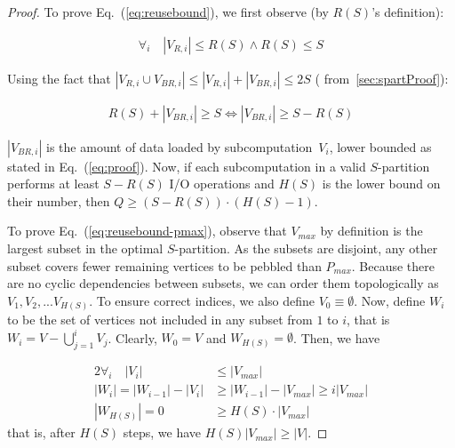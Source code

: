 \documentclass[sigplan,review,anonymous]{acmart}\settopmatter{printfolios=true,printccs=false,printacmref=false}
\begin{document}
\begin{proof}
	To prove Eq.~(\ref{eq:reusebound}), we first observe (by $R(S)$'s 
	definition):
	
	\vspace{-0.5em}
	\begin{gather}
	\nonumber
	\forall_{i}\quad |V_{R,i}| \le R(S) \land R(S) \le S 
	\end{gather}
	\vspace{-0.5em}
	
	Using the fact that $|V_{R,i} \cup V_{BR,i}| \le |V_{R,i}| + |V_{BR,i}| 
	\le 2S$ ( from~\cref{sec:spartProof}):
	
	\vspace{-0.5em}
	\begin{gather}
	\label{eq:proof}
	R(S) + |V_{BR,i}| \ge S \Leftrightarrow |V_{BR,i}| \ge S - R(S)
	\end{gather}
	\vspace{-0.5em}
	
	$|V_{BR,i}|$ is the amount of data loaded by subcomputation~$V_i$, lower 
	bounded as stated in Eq.~(\ref{eq:proof}). Now, if each
	subcomputation in a valid $S$-partition performs at least $S - R(S)$ I/O
	operations and $H(S)$ is the lower bound on their number, then $Q \ge (S -
	R(S)) \cdot (H(S) - 1)$.
	
	To prove Eq.~(\ref{eq:reusebound-pmax}), observe that $V_{max}$ by 
	definition
	is the largest subset in the optimal $S$-partition. As the subsets are
	disjoint, any other subset covers fewer remaining vertices to be pebbled 
	than
	$P_{max}$. Because there are no cyclic dependencies between subsets, we can
	order them topologically as $V_1, V_2, ...V_{H(S)}$. To ensure correct 
	indices,
	we also define $V_0 \equiv \emptyset$. Now, define $W_i$ to be the set
	of vertices not included in any subset from $1$ to $i$, that is $W_i = V -
	\bigcup_{j=1}^{i} V_j$. Clearly, $W_0 = V$ and $W_{H(S)} = \emptyset$. 
	Then, we
	have
	
	\vspace{-0.5em}
	\begin{alignat}{2}
	\nonumber
	\forall_{i}\quad |V_i| & \le |V_{max}| \\
	\nonumber
	|W_i| = |W_{i-1}| - |V_i| & \ge |W_{i-1}| - |V_{max}| \ge i|V_{max}| \\
	\nonumber
	|W_{H(S)}| = 0 & \ge H(S) \cdot |V_{max}| 
	\end{alignat}
	\vspace{-0.5em}
	that is, after $H(S)$ steps, we have $H(S) |V_{max}| \ge |V|$.
\end{proof}
\end{document}
